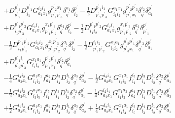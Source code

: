 \documentclass[aip,onecolumn,preprint]{revtex4-1}
\begin{document}
\begin{align}
  & + {{D^{{{p^\prime}_3}}_{{{p^\prime}_2}}}{D^{{{p^\prime}_1}}_{{i_1}}}{G^{{i_2}{i_1}}_{{a_1}{x_1}}}{g^{{{p^\prime}_2}{x_1}}_{{{p^\prime}_1}{{p^\prime}_3}}}{\delta^{{a_1}}_{q^\prime}}{\delta^{p^\prime}_{{i_2}}}} - {{{\frac{1}{2}}}{D^{{{p^\prime}_1}{i_1}}_{{{p^\prime}_2}{{p^\prime}_3}}}{G^{{a_1}{x_1}}_{{i_1}{i_2}}}{g^{{{p^\prime}_2}{{p^\prime}_3}}_{{{p^\prime}_1}{x_1}}}{\delta^{{i_2}}_{q^\prime}}{\delta^{p^\prime}_{{a_1}}}} \nonumber \\
  & + {{D^{{{p^\prime}_1}{{p^\prime}_2}}_{{i_1}{{p^\prime}_3}}}{G^{{i_2}{i_1}}_{{a_1}{x_1}}}{g^{{x_1}{{p^\prime}_3}}_{{{p^\prime}_1}{{p^\prime}_2}}}{\delta^{{a_1}}_{q^\prime}}{\delta^{p^\prime}_{{i_2}}}} - {{{\frac{1}{2}}}{D^{{{p^\prime}_1}{{p^\prime}_2}}_{{i_1}{i_2}}}{G^{{i_2}{i_1}}_{{a_1}{x_1}}}{g^{{x_1}{{p^\prime}_3}}_{{{p^\prime}_1}{{p^\prime}_2}}}{\delta^{{a_1}}_{q^\prime}}{\delta^{p^\prime}_{{{p^\prime}_3}}}} \nonumber \\
  & - {{{\frac{1}{2}}}{D^{{{p^\prime}_1}{{p^\prime}_2}}_{{i_1}{{p^\prime}_3}}}{G^{{i_1}{i_2}}_{{a_1}{x_1}}}{g^{{x_1}{{p^\prime}_3}}_{{{p^\prime}_1}{{p^\prime}_2}}}{\delta^{{a_1}}_{q^\prime}}{\delta^{p^\prime}_{{i_2}}}} - {{{\frac{1}{2}}}{D^{{i_1}{i_2}}_{{{p^\prime}_1}{{p^\prime}_2}}}{G^{{x_1}{a_1}}_{{i_1}{i_2}}}{g^{{{p^\prime}_2}{{p^\prime}_1}}_{{{p^\prime}_3}{x_1}}}{\delta^{{{p^\prime}_3}}_{q^\prime}}{\delta^{p^\prime}_{{a_1}}}} \nonumber \\
  & + {{D^{{{p^\prime}_1}{i_1}}_{{{p^\prime}_2}{{p^\prime}_3}}}{G^{{x_1}{a_1}}_{{i_1}{i_2}}}{g^{{{p^\prime}_2}{{p^\prime}_3}}_{{{p^\prime}_1}{x_1}}}{\delta^{{i_2}}_{q^\prime}}{\delta^{p^\prime}_{{a_1}}}} \nonumber \\
  & - {{{\frac{1}{4}}}{G^{{i_4}{i_2}}_{{a_3}{x_1}}}{G^{{a_1}{x_1}}_{{i_1}{i_3}}}{f^{{a_2}}_{{a_1}}}{D^{{i_3}}_{{i_4}}}{D^{{i_1}}_{{i_2}}}{\delta^{{a_3}}_{q^\prime}}{\delta^{p^\prime}_{{a_2}}}} - {{{\frac{1}{2}}}{G^{{i_2}{i_4}}_{{a_2}{x_1}}}{G^{{x_1}{a_1}}_{{i_3}{i_5}}}{f^{{i_5}}_{{i_1}}}{D^{{i_3}}_{{i_4}}}{D^{{i_1}}_{{i_2}}}{\delta^{{a_2}}_{q^\prime}}{\delta^{p^\prime}_{{a_1}}}} \nonumber \\
  & - {{{\frac{1}{2}}}{G^{{i_4}{i_2}}_{{a_2}{x_1}}}{G^{{a_1}{x_1}}_{{i_3}{i_5}}}{f^{{i_5}}_{{i_1}}}{D^{{i_3}}_{{i_4}}}{D^{{i_1}}_{{i_2}}}{\delta^{{a_2}}_{q^\prime}}{\delta^{p^\prime}_{{a_1}}}} - {{{\frac{1}{4}}}{G^{{i_2}{i_4}}_{{a_1}{x_1}}}{G^{{x_1}{a_3}}_{{i_1}{i_3}}}{f^{{a_1}}_{{a_2}}}{D^{{i_3}}_{{i_4}}}{D^{{i_1}}_{{i_2}}}{\delta^{{a_2}}_{q^\prime}}{\delta^{p^\prime}_{{a_3}}}} \nonumber \\
  & + {{{\frac{1}{2}}}{G^{{i_2}{i_4}}_{{a_3}{x_1}}}{G^{{a_1}{x_1}}_{{i_1}{i_3}}}{f^{{a_2}}_{{a_1}}}{D^{{i_3}}_{{i_4}}}{D^{{i_1}}_{{i_2}}}{\delta^{{a_3}}_{q^\prime}}{\delta^{p^\prime}_{{a_2}}}} + {{{\frac{1}{4}}}{G^{{i_2}{i_5}}_{{a_2}{x_1}}}{G^{{x_1}{a_1}}_{{i_1}{i_4}}}{f^{{i_3}}_{{i_5}}}{D^{{i_4}}_{{i_3}}}{D^{{i_1}}_{{i_2}}}{\delta^{{a_2}}_{q^\prime}}{\delta^{p^\prime}_{{a_1}}}} \nonumber \\

\end{align}
\end{document}
